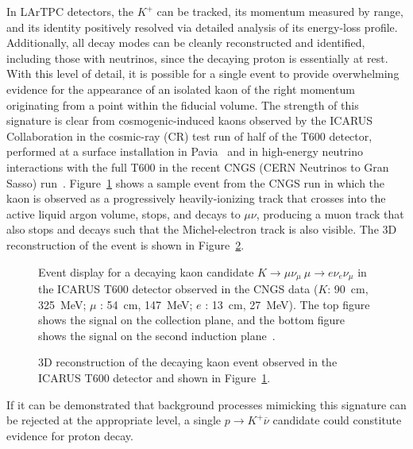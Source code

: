In LArTPC detectors, the $K^+$ can be tracked, its momentum measured
by range, and its identity positively resolved via detailed analysis
of its energy-loss profile.  Additionally, all decay modes can be
cleanly reconstructed and identified, including those with neutrinos,
since the decaying proton is essentially at rest.  With this level of
detail, it is possible for a single event to provide overwhelming
evidence for the appearance of an isolated kaon of the right momentum
originating from a point within the fiducial volume.  The strength of
this signature is clear from cosmogenic-induced kaons observed by the
ICARUS Collaboration in the cosmic-ray (CR) test run of half of the T600
detector, performed at a surface installation in Pavia~\cite{Amerio:2004ze} 
and in high-energy neutrino interactions with the full T600 in the recent 
CNGS (CERN Neutrinos to Gran Sasso) run~\cite{Antonello:2012hu}.
Figure~\ref{fig:icaruskaon} shows a sample event from the CNGS run in
which the kaon is observed as a progressively heavily-ionizing track 
that crosses into the active liquid argon volume, stops, and
decays to $\mu\nu$, producing a muon track that also stops and decays
such that the Michel-electron track is also visible. The 3D
reconstruction of the event is shown in Figure~\ref{fig:icarusk3d}.
%
\begin{figure}[!htb]
\centering
\caption[Decaying kaon observed during the ICARUS run at CNGS]
{Event display for a decaying kaon candidate $K \rightarrow \mu \nu_\mu \ \mu \rightarrow e \nu_e \nu_\mu$ 
in the ICARUS T600 detector observed
in the CNGS data ($K$: \SI{90}{\cm}, \SI{325}{\MeV}; $\mu$ : \SI{54}{\cm}, \SI{147}{\MeV}; 
$e$ : \SI{13}{\cm}, \SI{27}{\MeV}). The top figure shows the signal on the collection plane,
  and the bottom figure shows the signal on the second induction plane~\cite{Antonello:2012hu}.}
\label{fig:icaruskaon}
\end{figure}
\begin{figure}[!htb]
\caption[3D construction of decaying kaon in the ICARUS detector]{3D reconstruction of the decaying kaon event observed in the ICARUS T600 detector and shown in Figure~\ref{fig:icaruskaon}.}
\label{fig:icarusk3d}
\end{figure}

If it can be demonstrated that background processes mimicking this
signature can be rejected at the appropriate level, 
a single $p\to K^+\overline{\nu}$ candidate could constitute 
evidence for proton decay. %


